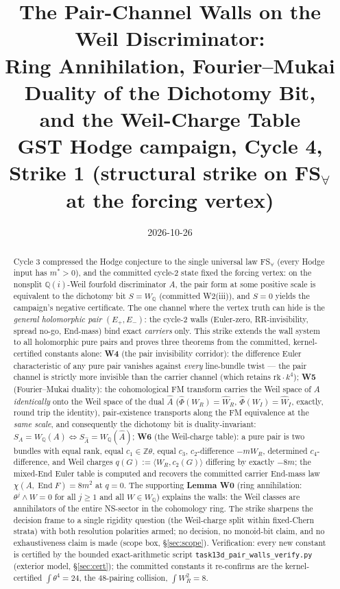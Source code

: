 \documentclass[11pt]{article}
\title{The Pair-Channel Walls on the Weil Discriminator:\\
Ring Annihilation, Fourier--Mukai Duality of the Dichotomy Bit,\\
and the Weil-Charge Table\\
\large GST Hodge campaign, Cycle 4, Strike 1 (structural strike on FS$_\forall$ at the forcing vertex)}
\date{2026-10-26}
\theoremstyle{definition}
\newcommand{\End}{\operatorname{End}}
\newcommand{\Q}{\mathbb{Q}}
\newcommand{\Z}{\mathbb{Z}}
\newcommand{\WQ}{W_{\Q}}
\newcommand{\FMc}{\widehat\Phi}
\begin{document}
\maketitle

\begin{abstract}
\noindent
Cycle 3 compressed the Hodge conjecture to the single universal law
FS$_\forall$ (every Hodge input has $m^*>0$), and the committed cycle-2
state fixed the forcing vertex: on the nonsplit $\Q(i)$-Weil fourfold
discriminator $A$, the pair form at some positive scale is equivalent to the
dichotomy bit $S=W_\Q$ (committed W2(iii)), and $S=0$ yields the campaign's
negative certificate. The one channel where the vertex truth can hide is the
\emph{general holomorphic pair} $(E_+,E_-)$: the cycle-2 walls
(Euler-zero, RR-invisibility, spread no-go, End-mass) bind exact
\emph{carriers} only. This strike extends the wall system to all holomorphic
pure pairs and proves three theorems from the committed, kernel-certified
constants alone:
\textbf{W4} (the pair invisibility corridor): the difference Euler
characteristic of any pure pair vanishes against \emph{every} line-bundle
twist --- the pair channel is strictly more invisible than the carrier
channel (which retains $\mathrm{rk}\cdot k^4$);
\textbf{W5} (Fourier--Mukai duality): the cohomological FM transform
carries the Weil space of $A$ \emph{identically} onto the Weil space of the
dual $\widehat A$ ($\FMc(W_R)=\widehat W_R$, $\FMc(W_I)=\widehat W_I$,
exactly, round trip the identity), pair-existence transports along the FM
equivalence at the \emph{same scale}, and consequently the dichotomy bit is
duality-invariant: $S_A=W_\Q(A)\iff S_{\widehat A}=W_\Q(\widehat A)$;
\textbf{W6} (the Weil-charge table): a pure pair is two bundles with equal
rank, equal $c_1\in\Z\theta$, equal $c_3$, $c_2$-difference $-mW_R$,
determined $c_4$-difference, and Weil charges
$q(G):=\langle W_R,c_2(G)\rangle$ differing by exactly $-8m$; the mixed-End
Euler table is computed and recovers the committed carrier End-mass law
$\chi(A,\End F)=8m^2$ at $q=0$.
The supporting \textbf{Lemma W0} (ring annihilation: $\theta^j\wedge W=0$ for
all $j\ge 1$ and all $W\in\WQ$) explains the walls: the Weil classes are
annihilators of the entire NS-sector in the cohomology ring.
The strike sharpens the decision frame to a single rigidity question (the
Weil-charge split within fixed-Chern strata) with both resolution polarities
armed; no decision, no monoid-bit claim, and no exhaustiveness claim is made
(scope box, \S\ref{sec:scope}).
Verification: every new constant is certified by the bounded exact-arithmetic
script \texttt{task13d\_pair\_walls\_verify.py} (exterior model, \S\ref{sec:cert});
the committed constants it re-confirms are the kernel-certified
$\int\theta^4=24$, the $48$-pairing collision, $\int W_R^2=8$.
\end{abstract}
\end{document}
